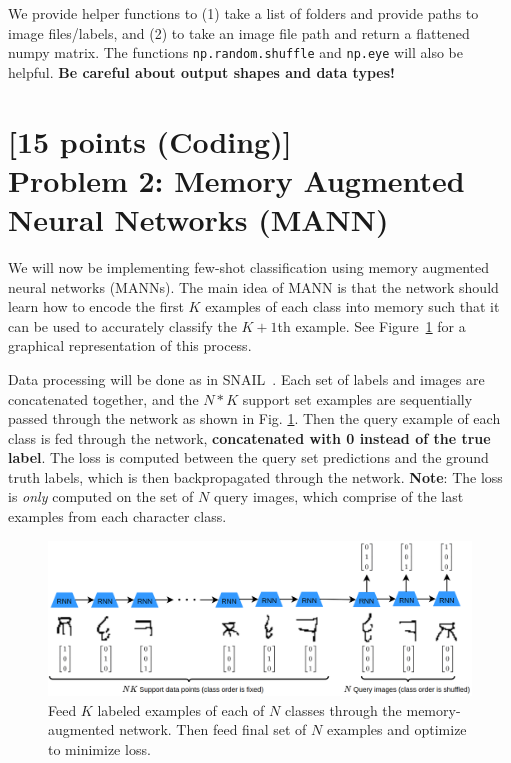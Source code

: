 \documentclass[12pt]{article}
\begin{document}
\noindent We provide helper functions to (1) take a list of folders and provide paths to image files/labels, and (2) to take an image file path and return a flattened numpy matrix. The functions \texttt{np.random.shuffle} and \texttt{np.eye} will also be helpful. \textbf{Be careful about output shapes and data types!}




\section*{[15 points (Coding)]\\Problem 2: Memory Augmented Neural Networks (MANN)     \cite{pmlr-v48-santoro16,DBLP:journals/corr/MishraRCA17}}

We will now be implementing few-shot classification using memory augmented neural networks (MANNs). The main idea of MANN is that the network should learn how to encode the first $K$ examples of each class into memory such that it can be used to accurately classify the $K+1$th example. See Figure~\ref{mann} for a graphical representation of this process.

Data processing will be done as in SNAIL~\cite{DBLP:journals/corr/MishraRCA17}. Each set of labels and images are concatenated together, and the $N*K$ support set examples are sequentially passed through the network as shown in Fig. \ref{mann}. Then the query example of each class is fed through the network, \textbf{concatenated with 0 instead of the true label}. The loss is computed between the query set predictions and the ground truth labels, which is then backpropagated through the network. \textbf{Note}: The loss is \textit{only} computed on the set of $N$ query images, which comprise of the last examples from each character class. 

\begin{figure}
\centering
\includegraphics[width=\linewidth]{figures/hw1seq.png}
\vspace{-9mm}
\caption{Feed $K$ labeled examples of each of $N$ classes through the memory-augmented network. Then feed final set of $N$ examples and optimize to minimize loss.}
\label{mann}
\end{figure}
\end{document}
